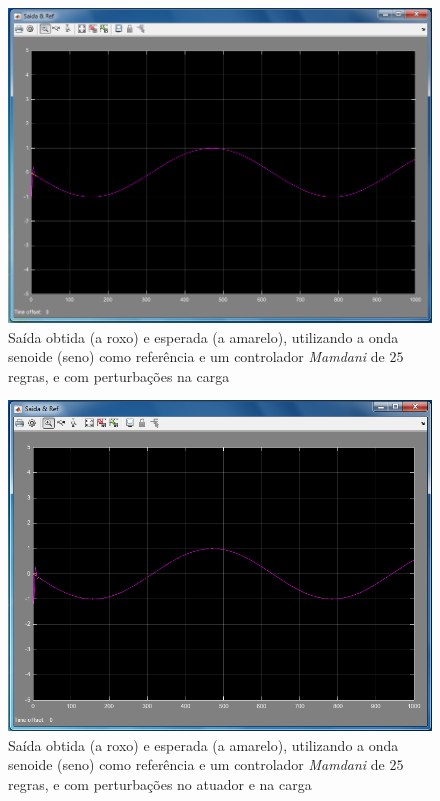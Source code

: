 \documentclass{article}
\begin{document}
\begin{figure}[h]
  \centering
      \includegraphics[scale=0.3]{Images/Mamdani_25_sin_charge.png}
  \caption{Saída obtida (a roxo) e esperada (a amarelo), utilizando a onda senoide (seno) como referência e um controlador \emph{Mamdani} de $25$ regras, e com perturbações na carga}
\end{figure}

\begin{figure}[h]
  \centering
      \includegraphics[scale=0.3]{Images/Mamdani_25_sin_actuator_charge.png}
  \caption{Saída obtida (a roxo) e esperada (a amarelo), utilizando a onda senoide (seno) como referência e um controlador \emph{Mamdani} de $25$ regras, e com perturbações no atuador e na carga}
\end{figure}
\end{document}
